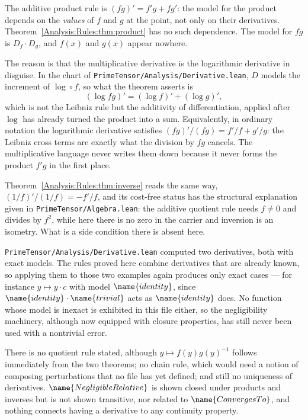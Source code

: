 \begin{designnote}
\label{Analysis:Rules:note:leibniz}
The additive product rule is $(fg)' = f'g + fg'$: the model for the product
depends on the \emph{values} of $f$ and $g$ at the point, not only on their
derivatives.  Theorem~\ref{Analysis:Rules:thm:product} has no such dependence.
The model for $fg$ is $D_f \cdot D_g$, and $f(x)$ and $g(x)$ appear nowhere.

The reason is that the multiplicative derivative is the logarithmic derivative
in disguise.  In the chart of
\texttt{PrimeTensor/Analysis/Derivative.lean}, $D$ models the increment of
$\log \circ f$, so what the theorem asserts is
\[
  (\log fg)' = (\log f)' + (\log g)',
\]
which is not the Leibniz rule but the additivity of differentiation, applied
after $\log$ has already turned the product into a sum.  Equivalently, in
ordinary notation the logarithmic derivative satisfies
$(fg)'/(fg) = f'/f + g'/g$: the Leibniz cross terms are exactly what the
division by $fg$ cancels.  The multiplicative language never writes them down
because it never forms the product $f'g$ in the first place.

Theorem~\ref{Analysis:Rules:thm:inverse} reads the same way,
$(1/f)'/(1/f) = -f'/f$, and its cost-free status has the structural
explanation given in \texttt{PrimeTensor/Algebra.lean}: the additive quotient
rule needs $f \neq 0$ and divides by $f^2$, while here there is no zero in the
carrier and inversion is an isometry.  What is a side condition there is
absent here.
\end{designnote}

\begin{remark}
\label{Analysis:Rules:rem:still-exact}
\texttt{PrimeTensor/Analysis/Derivative.lean} computed two derivatives, both
with exact models.  The rules proved here combine derivatives that are already
known, so applying them to those two examples again produces only exact cases
--- for instance $y \mapsto y \cdot c$ with model $\name{identity}$, since
$\name{identity} \cdot \name{trivial}$ acts as $\name{identity}$ does.  No
function whose model is inexact is exhibited in this file either, so the
negligibility machinery, although now equipped with closure properties, has
still never been used with a nontrivial error.
\end{remark}

\begin{remark}\label{Analysis:Rules:rem:missing}
There is no quotient rule stated, although $y \mapsto f(y)g(y)^{-1}$ follows
immediately from the two theorems; no chain rule, which would need a notion of
composing perturbations that no file has yet defined; and still no uniqueness
of derivatives.  $\name{NegligibleRelative}$ is shown closed under products and
inverses but is not shown transitive, nor related to $\name{ConvergesTo}$, and
nothing connects having a derivative to any continuity property.
\end{remark}

